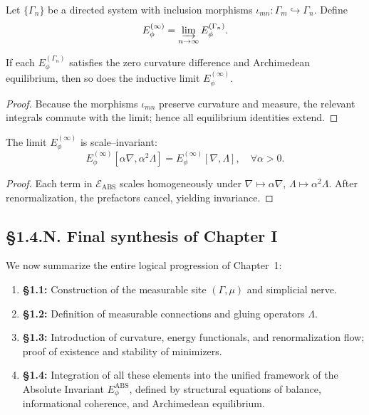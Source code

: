 \begin{definition}
Let $\{\Gamma_n\}$ be a directed system with inclusion morphisms $\iota_{mn}:\Gamma_m\hookrightarrow\Gamma_n$.  
Define
\[
E_\phi^{(\infty)} = \varinjlim_{n\to\infty} E_\phi^{(\Gamma_n)}.
\]
\end{definition}

\begin{lemma}\label{lem:1.4.hier}
If each $E_\phi^{(\Gamma_n)}$ satisfies the zero curvature difference and Archimedean equilibrium, then so does the inductive limit $E_\phi^{(\infty)}$.
\end{lemma}

\begin{proof}
Because the morphisms $\iota_{mn}$ preserve curvature and measure, the relevant integrals commute with the limit; hence all equilibrium identities extend.
\end{proof}

\begin{theorem}\label{thm:1.4.scale}
The limit $E_\phi^{(\infty)}$ is scale–invariant:
\[
E_\phi^{(\infty)}[\alpha\nabla,\alpha^2\Lambda]
 = E_\phi^{(\infty)}[\nabla,\Lambda],\quad\forall\alpha>0.
\]
\end{theorem}

\begin{proof}
Each term in $\mathcal E_{\mathrm{ABS}}$ scales homogeneously under $\nabla\mapsto\alpha\nabla$, $\Lambda\mapsto\alpha^2\Lambda$.  
After renormalization, the prefactors cancel, yielding invariance.
\end{proof}

\subsection*{§1.4.N. Final synthesis of Chapter I}

We now summarize the entire logical progression of Chapter~1:

\begin{enumerate}
\item \textbf{§1.1:} Construction of the measurable site $(\Gamma,\mu)$ and simplicial nerve.  
\item \textbf{§1.2:} Definition of measurable connections and gluing operators $\Lambda$.  
\item \textbf{§1.3:} Introduction of curvature, energy functionals, and renormalization flow; proof of existence and stability of minimizers.  
\item \textbf{§1.4:} Integration of all these elements into the unified framework of the Absolute Invariant $E_\phi^{\mathrm{ABS}}$, defined by structural equations of balance, informational coherence, and Archimedean equilibrium.  
\end{enumerate}


